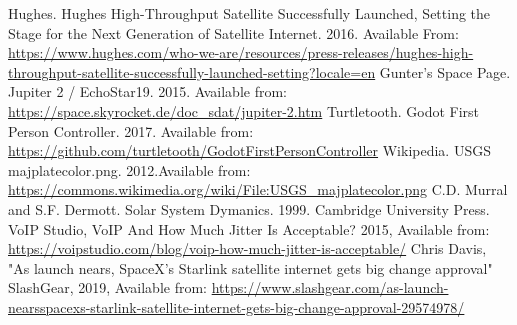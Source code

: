 \documentclass[12pt,a4paper,twoside,openright]{report}
\begin{document}
\begin{thebibliography}{99}
	 Hughes. Hughes High-Throughput Satellite Successfully Launched, Setting the Stage for the Next Generation of Satellite Internet.
	2016. Available From: \url{https://www.hughes.com/who-we-are/resources/press-releases/hughes-high-throughput-satellite-successfully-launched-setting?locale=en}
	 Gunter's Space Page. Jupiter 2 / EchoStar19.
	2015. Available from: \url{https://space.skyrocket.de/doc_sdat/jupiter-2.htm}
	 Turtletooth. Godot First Person Controller. 
	2017. Available from: \url{https://github.com/turtletooth/GodotFirstPersonController}
	 Wikipedia. USGS majplatecolor.png.
	2012.Available from: \url{https://commons.wikimedia.org/wiki/File:USGS_majplatecolor.png}
	 C.D. Murral and S.F. Dermott. Solar System Dymanics. 1999. Cambridge University Press.
	 VoIP Studio, VoIP And How Much Jitter Is Acceptable?
	2015, Available from: \url{https://voipstudio.com/blog/voip-how-much-jitter-is-acceptable/}
	 Chris Davis, "As launch nears, SpaceX’s Starlink satellite internet gets big change approval"
	SlashGear, 2019, Available from: \url{https://www.slashgear.com/as-launch-nearsspacexs-starlink-satellite-internet-gets-big-change-approval-29574978/}
\end{thebibliography}


\end{document}
